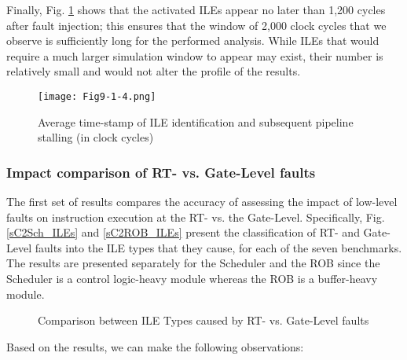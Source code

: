 \documentclass[12pt]{yalephd}
\newcommand{\snp}[1] {\noindent {\underline {#1}}}
\begin{document}
Finally, Fig. \ref{sC2results_times} shows that the activated ILEs appear no later than 1,200 cycles after fault injection; this ensures that the window of 2,000 clock cycles that we observe is sufficiently long for the performed analysis. While ILEs that would require a much larger simulation window to appear may exist, their number is relatively small and would not alter the profile of the results.


\begin{figure}[!ht]
\centering
\texttt{[image: Fig9-1-4.png]}
\caption{Average time-stamp of ILE identification and subsequent pipeline stalling (in clock cycles)}
\label{sC2results_times}
\end{figure}

\subsubsection{Impact comparison of RT- vs. Gate-Level faults}

\snp{Impact consistency:} The first set of results compares the accuracy of assessing the impact of low-level faults on instruction execution at the RT- vs. the Gate-Level. Specifically, Fig. \ref{sC2Sch_ILEs} and \ref{sC2ROB_ILEs} present the classification of RT- and Gate-Level faults into the ILE types that they cause, for each of the seven benchmarks. The results are presented separately for the Scheduler and the ROB since the Scheduler is a control logic-heavy module whereas the ROB is a buffer-heavy module. 

\begin{figure}[!ht]
\centering
{}
\caption{Comparison between ILE Types caused by RT- vs. Gate-Level faults}
\end{figure}

Based on the results, we can make the following observations:
\end{document}
